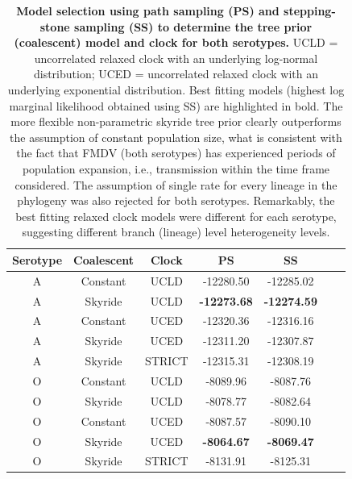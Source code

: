 \documentclass[a4paper,10pt]{article}
\begin{document}
\newpage
\begin{table}[H]
\caption{\textbf{Model selection using path sampling (PS) and stepping-stone sampling (SS) to determine the tree prior (coalescent) model and clock for both serotypes.}
UCLD = uncorrelated relaxed clock with an underlying log-normal distribution; UCED = uncorrelated relaxed clock with an underlying exponential distribution.
Best fitting models (highest log marginal likelihood obtained using SS) are highlighted in bold.
The more flexible non-parametric skyride tree prior clearly outperforms the assumption of constant population size, what is consistent with the fact that FMDV (both serotypes) has experienced periods of population expansion, i.e., transmission within the time frame considered.
The assumption of single rate for every lineage in the phylogeny was also rejected for both serotypes.
Remarkably, the best fitting relaxed clock models were different for each serotype, suggesting different branch (lineage) level heterogeneity levels.
}
\begin{center}
\begin{tabular}{ccccccc}
\toprule
Serotype	& Coalescent	& Clock	& PS  & SS\\             
\midrule
A	& Constant	 & UCLD	& -12280.50& -12285.02\\
A	& Skyride 	& UCLD	& \textbf{-12273.68} & \textbf{-12274.59}\\
A	& Constant	 & UCED	& -12320.36 & -12316.16\\
A	& Skyride 	& UCED	& -12311.20 & -12307.87\\
A       & Skyride       & STRICT & -12315.31 & -12308.19\\
O	& Constant	& UCLD	& -8089.96& -8087.76\\
O	& Skyride 	& UCLD	& -8078.77 & -8082.64\\
O	& Constant	& UCED	&-8087.57 & -8090.10\\
O	& Skyride 	& UCED	& \textbf{-8064.67}& \textbf{-8069.47}\\
O       & Skyride       & STRICT & -8131.91& -8125.31\\
\bottomrule
\end{tabular}
\end{center}
\begin{flushleft}
\end{flushleft}
\label{stab:treeclockselection}
 \end{table}
\end{document}
